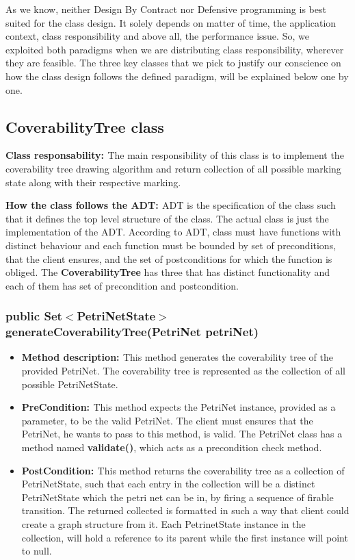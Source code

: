 As we know, neither Design By Contract nor Defensive programming is best suited for the class design. It solely depends on matter of time, the application context, class responsibility  and above all, the performance issue. So, we exploited both paradigms when we are distributing class responsibility, wherever they are feasible. The three key classes that we pick to justify our  conscience  on  how  the class  design follows the defined paradigm, will be explained below one by one.

\subsection{CoverabilityTree class}
{\bf{Class responsability: }} The main responsibility of this class is to implement the coverability tree drawing algorithm and return collection of all possible marking state along with their respective marking. 

{\bf{How the class follows the ADT: }} ADT is the specification of the class such that it defines the top level  structure of the class. The actual class is just the implementation of the ADT. According to ADT, class must have  functions with distinct behaviour and each function must be bounded by set of preconditions, that the client ensures, and the set of postconditions for which the function is obliged. The {\bf{CoverabilityTree}} has three that has distinct functionality and each of them has  set of precondition and postcondition.


\subsubsection*{\bf{public Set$<$PetriNetState$>$ generateCoverabilityTree(PetriNet petriNet)}}
\begin{itemize}[label={},leftmargin=2em]

\item {\bf{Method description: }} This method generates the coverability tree of the provided PetriNet. The coverability tree is represented as the collection of all possible PetriNetState.

\item {\bf{PreCondition: }} This method expects  the PetriNet instance, provided as a parameter, to be the valid PetriNet. The client must ensures that the PetriNet, he wants to pass to this method, is valid. The PetriNet class has a method named {\bf{validate()}}, which acts as a precondition check method.

\item {\bf{PostCondition: }} This method returns the coverability tree as a collection of PetriNetState, such that each entry in the collection will be a distinct PetriNetState which the petri net can be in, by firing a sequence of firable transition.  The returned  collected is formatted in such a way that client could create a graph structure from it. Each PetrinetState instance in the collection,  will hold  a reference to its parent while the first instance will point to null.

\end{itemize}

